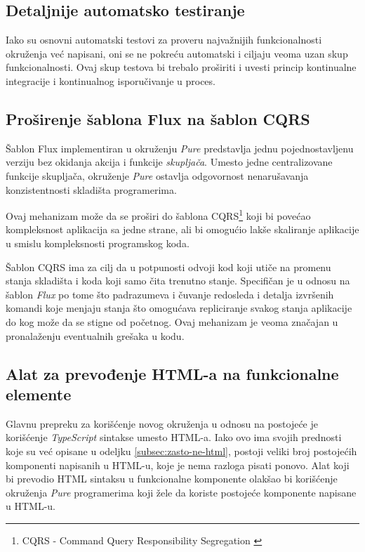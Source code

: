 \documentclass[12pt,oneside]{memoir}
\begin{document}
\subsection{Detaljnije automatsko testiranje}
Iako su osnovni automatski testovi za proveru najvažnijih
funkcionalnosti okruženja već napisani, oni se ne pokreću
automatski i ciljaju veoma uzan skup funkcionalnosti. Ovaj skup
testova bi trebalo proširiti i uvesti princip kontinualne
integracije i kontinualnog isporučivanje u proces.

\subsection{Proširenje šablona Flux na šablon CQRS}
Šablon Flux implementiran u okruženju \emph{Pure} predstavlja jednu
pojednostavljenu verziju bez okidanja akcija i funkcije
\emph{skupljača}. Umesto jedne centralizovane funkcije skupljača,
okruženje \emph{Pure} ostavlja odgovornost nenarušavanja
konzistentnosti skladišta programerima.

Ovaj mehanizam može da se proširi do šablona CQRS\footnote{CQRS - Command Query Responsibility Segregation \cite{CQRS}} \cite{CQRS} koji bi povećao
kompleksnost aplikacija sa jedne strane, ali bi omogućio lakše
skaliranje aplikacije u smislu kompleksnosti programskog koda.

Šablon CQRS ima za cilj da u potpunosti odvoji kod koji utiče na
promenu stanja skladišta i koda koji samo čita trenutno stanje.
Specifičan je u odnosu na šablon \emph{Flux} po tome što padrazumeva i čuvanje redosleda i detalja izvršenih komandi koje menjaju stanja što omogućava repliciranje svakog stanja aplikacije
do kog može da se stigne od početnog. Ovaj mehanizam je veoma značajan u pronalaženju eventualnih grešaka u kodu.
\subsection{Alat za prevođenje HTML-a na funkcionalne elemente}
Glavnu prepreku za korišćenje novog okruženja u odnosu na postojeće je korišćenje \emph{TypeScript} sintakse umesto HTML-a. Iako ovo ima svojih prednosti koje su već opisane u odeljku \ref{subsec:zasto-ne-html}, postoji veliki broj postojećih komponenti
napisanih u HTML-u, koje je nema razloga pisati ponovo.
Alat koji bi prevodio HTML sintaksu u funkcionalne komponente olakšao bi korišćenje okruženja \emph{Pure} programerima koji žele da koriste postojeće komponente napisane u HTML-u.

\end{document}
